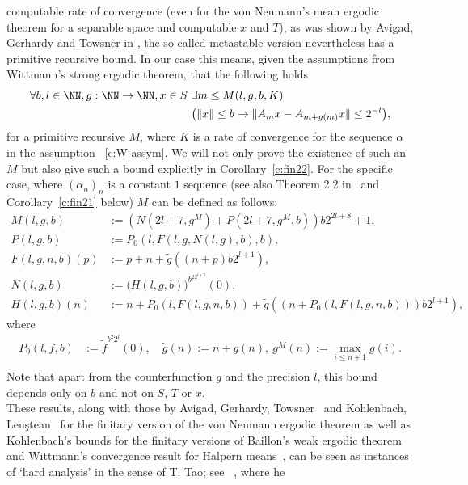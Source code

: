 computable rate of convergence (even for the 
von Neumann's mean ergodic theorem for a separable space and computable $x$ and $T$),
as was shown by Avigad, Gerhardy and Towsner in \cite{AGT08},
the so called metastable version nevertheless has a primitive recursive bound.
In our case this means, given the assumptions from Wittmann's strong ergodic theorem, 
that the following holds
\begin{align*}
\forall b, l\in\NN, g:\NN\to\NN, x\in S\ &\exists m\leq M(l,g,b,K)\\ 
&\big( \|x\|\leq b \rightarrow \|A_mx-A_{m+g(m)}x\|\leq 2^{-l} \big),
\end{align*}
for a primitive recursive $M$, where $K$ is a rate of convergence for the sequence $\alpha$ in
the assumption ~\eqref{e:W-assym}. 
We will not only prove the existence of such an $M$ but also give such a bound explicitly in Corollary~\ref{c:fin22}. 
For the specific case, where $(\alpha_n)_n$ is a constant $1$ sequence 
(see also Theorem 2.2 in~\cite{Wittmann90} and Corollary~\ref{c:fin21} below) 
$M$ can be defined as follows:
\begin{align*}
M(l,g,b)&:=(N( 2l+7, g^M) + P( 2l+7, g^M, b)){b}2^{2l+8}+1,\\
P(l,g,b)&:=P_0(l,F(l,g,N(l,g),b),b),\\
F(l,g,n,b)(p) &:= p+n+\tilde g((n + p){b}2^{l+1}),\\
N(l,g,b)&:= \big(H(l,g,b) \big)^{{b}^22^{l+2}}(0), \\
H(l,g,b)(n) &:= n+P_0(l,F(l,g,n,b))+\tilde g((n + P_0(l,F(l,g,n,b))){b}2^{l+1}),
\end{align*}
where
\begin{align*}
 P_0(l,f,b)&:=\tilde f^{ {b}^2 2^l}(0),\quad \tilde g(n):=n+g(n),\ g^M(n):=\max_{i\leq n+1} g(i).\\
\end{align*}
Note that apart from the counterfunction $g$ and the precision $l$,
this bound depends only on $b$ and not on $S$, $T$ or $x$.\\
These results, along with those 
by Avigad, Gerhardy, Towsner~\cite{AGT08} and Kohlenbach,  
Leu{\c{s}}tean~\cite{Kohlenbach2010} for the finitary version of the von Neumann ergodic theorem 
as well as Kohlenbach's bounds for the finitary versions of Baillon's weak ergodic theorem~\cite{Kohlenbach} and Wittmann's 
convergence result for Halpern means~\cite{Kohlenbach2011}, 
can be seen as instances of `hard analysis' in the sense of T. Tao; see ~\cite{Tao07, tao-2007}, where he
